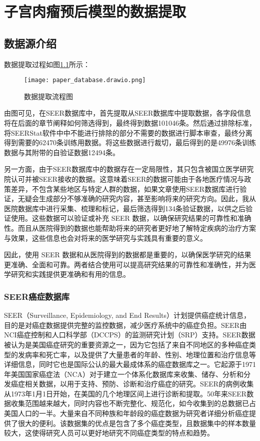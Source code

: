 \chapter{子宫肉瘤预后模型的数据提取}
\label{cha:data}

\section{数据源介绍}

数据提取过程如图\ref{fig:dataset1}所示：

\begin{figure}[!htbp]
    \centering
    \texttt{[image: paper\_database.drawio.png]}
    \caption{数据提取流程图} \label{fig:dataset1}
\end{figure}

由图可见，在SEER数据库中，首先提取从SEER数据库中提取数据，各字段信息将在后面的章节阐释如何筛选得到，最终得到数据101046条。然后通过排除标准，将SEERStat软件中中不能进行排除的部分不需要的数据进行脚本审查，最终分离得到需要的62470条训练用数据。将这些数据进行裁切，最后得到的是49976条训练数据与其附带的自验证数据12494条。

另一方面，由于SEER数据库中的数据存在一定局限性，其只包含被国立医学研究院认可并被SEER接收的数据。这意味着SEER的数据可能由于各地医疗情况与政策差异，不包含某些地区与特定人群的数据，如果文章使用SEER数据库进行验证，无疑会生成部分不够准确的研究内容，甚至影响将来的研究方向。因此，我从医院数据库中进行采集、梳理和标记，最后筛选得到134条验证数据，以供之后验证使用。这些数据可以验证或补充 SEER 数据，以确保研究结果的可靠性和准确性。而且从医院得到的数据也能帮助将来的研究者更好地了解特定疾病的治疗方案与效果，这些信息也会对将来的医学研究与实践具有重要的意义。

因此，使用 SEER 数据和从医院得到的数据都是重要的，以确保医学研究的结果更准确、全面和可靠。两者结合使用可以提高研究结果的可靠性和准确性，并为医学研究和实践提供更准确和有用的信息。

\subsection{SEER癌症数据库}

SEER（Surveillance, Epidemiology, and End Results）计划提供癌症统计信息，目的是对癌症数据提供完整的监控数据，减少医疗系统中的癌症负担。SEER由NCI癌症控制和人口科学部（DCCPS）的监测研究计划（SRP）支持。SEER数据被认为是美国癌症研究的重要资源之一，因为它包括了来自不同地区的多种癌症类型的发病率和死亡率，以及提供了大量患者的年龄、性别、地理位置和治疗信息等详细信息，同时它也是国际公认的最大最成体系的癌症数据库之一。它起源于1971年美国国家癌症法（NCA）对于建立一个体系化数据库来收集、储存、分析和分发癌症相关数据，以用于支持、预防、诊断和治疗癌症的研究。SEER的病例收集从1973年1月1日开始，在美国的几个地理区间上进行诊断和提取。50年来SEER数据收集范围越来越大，同时内容也不断完整化、规范化，如今收集到的总数据已占美国人口的一半。大量来自不同种族和年龄段的癌症数据为研究者详细分析癌症提供了很大的便利。该数据集的优点是包含了多个癌症类型，且数据集中的样本数量较大，这使得研究人员可以更好地研究不同癌症类型的特点和趋势。

